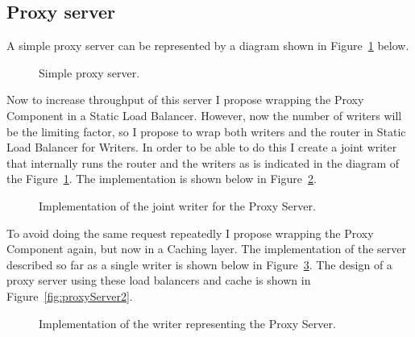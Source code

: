 \subsection{Proxy server}
A simple proxy server can be represented by a diagram shown in 
Figure~\ref{fig:proxyServer} below.
\begin{figure}[h]
\centering
{}
\caption[scale=1.0]{Simple proxy server.}
\label{fig:proxyServer}
\end{figure}

Now to increase throughput of this server I propose wrapping the Proxy
Component in a Static Load Balancer. However, now the number of writers
will be the limiting factor, so I propose to wrap both writers and 
the router in Static Load Balancer for Writers. In order to be able 
to do this I create a joint writer that internally runs the router and
the writers as is indicated in the diagram of the Figure~\ref{fig:proxyServer}.
The implementation is shown below in Figure~\ref{fig:ProxyWriters}.
\begin{figure}[h]
  
\caption[scale=1.0]{Implementation of the joint writer for the Proxy Server.}
\label{fig:ProxyWriters}
\end{figure}

To avoid doing the same request repeatedly I propose
wrapping the Proxy Component again, but now in a Caching layer. The 
implementation of the server described so far as a single writer is shown
below in Figure~\ref{fig:ProxyWriter}. The design of a proxy server using 
these load balancers and cache is shown in Figure~\ref{fig:proxyServer2}.
\begin{figure}[h]
 
\caption[scale=1.0]{Implementation of the writer representing the Proxy Server.}
\label{fig:ProxyWriter}
\end{figure}

